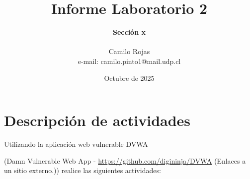 \documentclass[letter,12pt]{article}
\begin{document}
%
   \title{\Huge{Informe Laboratorio 2}}

   \author{\textbf{Sección x} \\  \\Camilo Rojas \\ e-mail: camilo.pinto1@mail.udp.cl}
          
   \date{Octubre de 2025}

   \maketitle
   
   \tableofcontents
 
  \newpage
  

\section{Descripción de actividades}
Utilizando la aplicación web vulnerable DVWA

(Damn Vulnerable Web App - \href{https://github.com/digininja/DVWA}{https://github.com/digininja/DVWA} (Enlaces a un sitio externo.)) realice las siguientes actividades:
\end{document}
